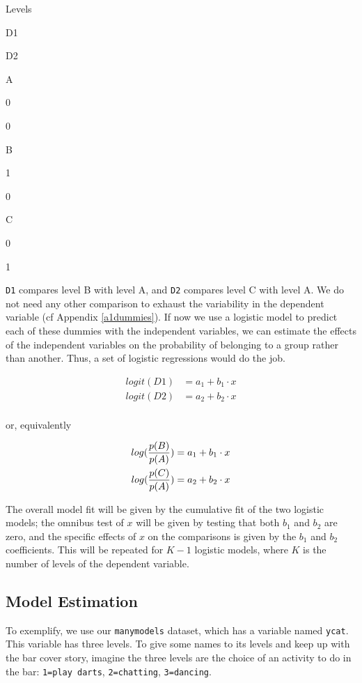 \documentclass[
]{book}
\begin{document}
Levels

D1

D2

A

0

0

B

1

0

C

0

1

\texttt{D1} compares level B with level A, and \texttt{D2} compares level C with level A. We do not need any other comparison to exhaust the variability in the dependent variable (cf Appendix \ref{a1dummies}). If now we use a logistic model to predict each of these dummies with the independent variables, we can estimate the effects of the independent variables on the probability of belonging to a group rather than another. Thus, a set of logistic regressions would do the job.

\begin{align*}
 logit(D1)  &= a_1 + b_1 \cdot x   \\
 logit(D2)  &= a_2 + b_2 \cdot x   \\
\end{align*}

or, equivalently

\begin{align*}
 log({p(B) \over p(A)})  &= a_1 + b_1 \cdot x   \\
 log({p(C) \over p(A)})  &= a_2 + b_2 \cdot x   \\
\end{align*}

The overall model fit will be given by the cumulative fit of the two logistic models; the omnibus test of \(x\) will be given by testing that both \(b_1\) and \(b_2\) are zero, and the specific effects of \(x\) on the comparisons is given by the \(b_1\) and \(b_2\) coefficients. This will be repeated for \(K-1\) logistic models, where \(K\) is the number of levels of the dependent variable.

\hypertarget{model-estimation-1}{%
\subsection{Model Estimation}\label{model-estimation-1}}

To exemplify, we use our \texttt{manymodels} dataset, which has a variable named \texttt{ycat}. This variable has three levels. To give some names to its levels and keep up with the bar cover story, imagine the three levels are the choice of an activity to do in the bar: \texttt{1=play\ darts}, \texttt{2=chatting}, \texttt{3=dancing}.
\end{document}
